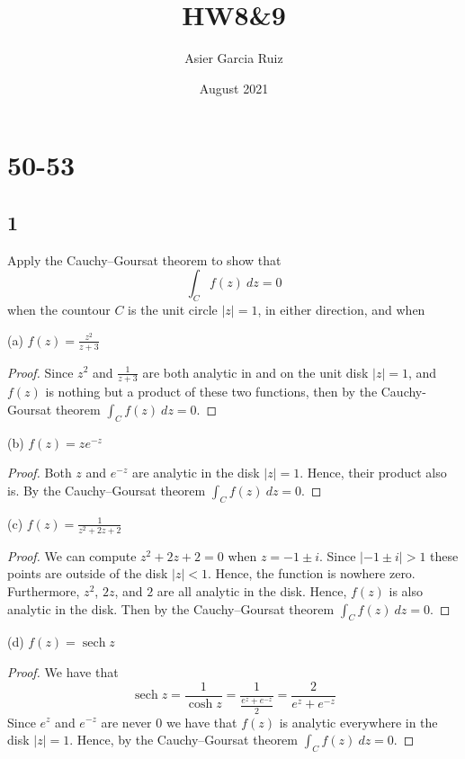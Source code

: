 \documentclass{article}
\title{HW8\&9}
\author{Asier Garcia Ruiz }
\date{August 2021}
\DeclareMathOperator*{\sech}{sech}
\begin{document}
\maketitle

\section*{50-53}
\subsection*{1}
Apply the Cauchy–Goursat theorem to show that
\begin{equation*}
    \int_C f(z) \ dz = 0
\end{equation*}
when the countour $C$ is the unit circle $|z| = 1$,
in either direction, and when


(a) $f(z) = \frac{z^2}{z+3}$
\begin{proof}
    Since $z^2$ and $\frac{1}{z + 3}$ are both analytic in and on the unit disk $|z|= 1$,
    and $f(z)$ is nothing but a product of these two functions,
    then by the Cauchy-Goursat theorem $\int_C f(z) \ dz = 0$.
\end{proof}

(b) $f(z) = ze^{-z}$
\begin{proof}
    Both $z$ and $e^{-z}$ are analytic in the disk $|z|=1$. Hence, their product
    also is. By the Cauchy–Goursat theorem $\int_C f(z) \ dz = 0$.
\end{proof}

(c) $f(z) = \frac{1}{z^2 + 2z + 2}$
\begin{proof}
    We can compute $z^2 + 2z + 2 = 0$ when $z = -1 \pm i$. Since $|-1 \pm i| > 1$
    these points are outside of the disk $|z| < 1$. Hence, the function is
    nowhere zero. Furthermore, $z^2$, $2z$, and $2$ are all analytic in the disk.
    Hence, $f(z)$ is also analytic in the disk. Then by the Cauchy–Goursat
    theorem $\int_C f(z) \ dz = 0$.
\end{proof}

(d) $f(z) = \sech z$
\begin{proof}
    We have that
    \begin{equation*}
        \sech z = \frac{1}{\cosh z} = \frac{1}{\frac{e^z + e^{-z}}{2}} =
        \frac{2}{e^z + e^{-z}}
    \end{equation*}
    Since $e^z$ and $e^{-z}$ are never $0$ we have that $f(z)$ is analytic
    everywhere in the disk $|z| = 1$. Hence, by the Cauchy–Goursat theorem
    $\int_C f(z) \ dz = 0$.
\end{proof}
\end{document}
